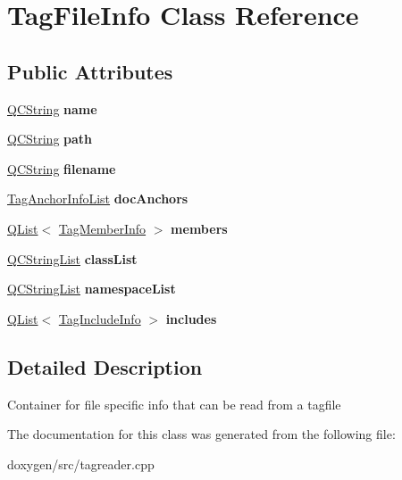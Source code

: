 \hypertarget{class_tag_file_info}{}\section{Tag\+File\+Info Class Reference}
\label{class_tag_file_info}
\subsection*{Public Attributes}
\begin{DoxyCompactItemize}
\item 
\mbox{\label{class_tag_file_info_a2419c9a8697d9b7d640ac122c48273b1}} 
\mbox{\hyperlink{class_q_c_string}{Q\+C\+String}} {\bfseries name}
\item 
\mbox{\label{class_tag_file_info_ae61e74f02e72cf90e0c27b5d9451a88e}} 
\mbox{\hyperlink{class_q_c_string}{Q\+C\+String}} {\bfseries path}
\item 
\mbox{\label{class_tag_file_info_a4588a4b981099ed4633866a6c5636e6e}} 
\mbox{\hyperlink{class_q_c_string}{Q\+C\+String}} {\bfseries filename}
\item 
\mbox{\label{class_tag_file_info_aecec4d141a4948096764f7a1690fc005}} 
\mbox{\hyperlink{class_tag_anchor_info_list}{Tag\+Anchor\+Info\+List}} {\bfseries doc\+Anchors}
\item 
\mbox{\label{class_tag_file_info_a007e8381a72298b5fd057c8927384897}} 
\mbox{\hyperlink{class_q_list}{Q\+List}}$<$ \mbox{\hyperlink{class_tag_member_info}{Tag\+Member\+Info}} $>$ {\bfseries members}
\item 
\mbox{\label{class_tag_file_info_a2451fb11417d8d449d81418c112ab23f}} 
\mbox{\hyperlink{class_q_c_string_list}{Q\+C\+String\+List}} {\bfseries class\+List}
\item 
\mbox{\label{class_tag_file_info_ae9f67c58e12c3838e9bc2aeec89812e0}} 
\mbox{\hyperlink{class_q_c_string_list}{Q\+C\+String\+List}} {\bfseries namespace\+List}
\item 
\mbox{\label{class_tag_file_info_acc05454624a34a3ce80c22205ace9524}} 
\mbox{\hyperlink{class_q_list}{Q\+List}}$<$ \mbox{\hyperlink{class_tag_include_info}{Tag\+Include\+Info}} $>$ {\bfseries includes}
\end{DoxyCompactItemize}


\subsection{Detailed Description}
Container for file specific info that can be read from a tagfile 

The documentation for this class was generated from the following file\+:\begin{DoxyCompactItemize}
\item 
doxygen/src/tagreader.\+cpp\end{DoxyCompactItemize}
